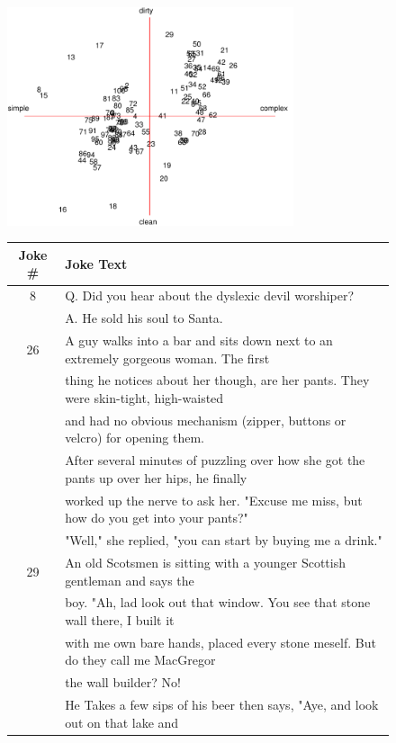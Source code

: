\documentclass{article} %
\begin{document}
\begin{figure} [h]
\centering
\includegraphics[width = 0.75\textwidth]{jokes_2d_2.pdf}
\begin{tabular}{c | l}
\hline \hline
Joke \# & Joke Text \\ \hline
  8     & Q. Did you hear about 
the dyslexic devil worshiper? \\
        & A. He sold his soul to Santa.\\ \hline
  26 & A guy walks into a bar and sits down next to an extremely
       gorgeous woman. The first \\
     & thing he notices about her though, are her pants. They were
       skin-tight, high-waisted \\
     & and had no obvious mechanism (zipper, buttons or velcro) for opening them. \\
     & After several minutes of puzzling over how she got the pants up over
       her hips, he finally \\
     & worked up the nerve to ask her. "Excuse me miss, but how do you get into your pants?" \\ 
     & "Well," she replied, "you can start by buying me a drink."\\ \hline
  29 & An old Scotsmen is sitting with a younger Scottish gentleman
       and says the \\
     &  boy. "Ah, lad look out that window. You see that stone wall
       there, I built it \\
     & with me own bare hands, placed every stone meself. But do they
       call me MacGregor \\
     & the wall builder? No! \\
     & He Takes a few sips of his beer then says, "Aye, and look out
       on that lake and \\

\end{tabular}
\end{figure}
\end{document}
